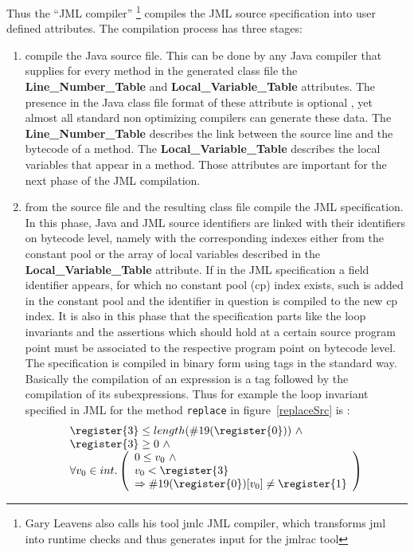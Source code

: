 Thus the ``JML compiler'' \footnote{Gary Leavens also calls his tool jmlc JML compiler, which transforms jml into runtime checks and thus generates input for the jmlrac tool  } compiles the JML source specification into user defined attributes. The compilation process has three stages:
\begin{enumerate}
\item compile the Java source file. This can be done by any Java compiler that supplies for every method in the generated class file 
the \textbf{Line\_Number\_Table} and \textbf{Local\_Variable\_Table}  attributes. The presence in the Java class file format of 
these attribute is optional \cite{VMSpec}, yet almost all standard non optimizing compilers can generate these data. 
The \textbf{Line\_Number\_Table} describes the link between the source line and the bytecode of a method.  
The \textbf{Local\_Variable\_Table} describes the local variables that appear in a method. 
Those attributes are important for the next phase of the JML compilation.
\item from the source file and the resulting class file compile the JML specification. In this phase, Java and JML source identifiers are 
linked with their identifiers on bytecode level, namely with the corresponding indexes either from the constant pool or the array of 
local variables described in the \textbf{Local\_Variable\_Table} attribute. If in the JML specification a field
identifier appears, for which no constant pool (cp) index exists, such is added in the constant pool and the identifier in question
is compiled to the new cp index. It is also in this phase that the specification parts like the loop invariants and the assertions which should hold at a certain source program point must be associated to the respective program point on bytecode level. The specification
is compiled in binary form using tags in the standard way. Basically the compilation of an expression is a tag followed by the compilation of its subexpressions. 
Thus for example the loop invariant specified in JML for the method \texttt{replace} in figure~\ref{replaceSrc} is :
$$
\begin{array}{l}
\register{3} \le length(\#19(\register{0})) \ \wedge \\
\register{3} \ge 0  \ \wedge \\ 
       \forall  v_0 \in int . \left(\begin{array}{l} 0 \le v_0 \ \wedge \\ v_0 < \register{3}  \\
                \Rightarrow  \#19(\register{0})[v_0] \neq \register{1} \end{array} \right)

\end{array}$$
\end{enumerate}

